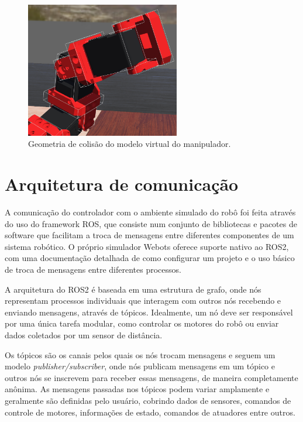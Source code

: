 \begin{figure}
    \centering
    \includegraphics[width=0.6\textwidth]{./Images/dynamic-model.png}
    \caption{Geometria de colisão do modelo virtual do manipulador.}\label{fig:dyn-chain}
\end{figure}

\section{Arquitetura de comunicação}

A comunicação do controlador com o ambiente simulado do robô foi feita através
do uso do framework ROS, que consiste num conjunto de bibliotecas e pacotes de
software que facilitam a troca de mensagens entre diferentes componentes de um
sistema robótico. O próprio simulador Webots oferece suporte nativo ao ROS2,
com uma documentação detalhada de como configurar um projeto e o uso básico de
troca de mensagens entre diferentes processos.

A arquitetura do ROS2 é baseada em uma estrutura de grafo, onde nós representam
processos individuais que interagem com outros nós recebendo e enviando
mensagens, através de tópicos. Idealmente, um nó deve ser responsável por uma
única tarefa modular, como controlar os motores do robô ou enviar dados
coletados por um sensor de distância.

Os tópicos são os canais pelos quais os nós trocam mensagens e seguem um modelo
\emph{publisher/subscriber}, onde nós publicam mensagens em um tópico e outros
nós se inscrevem para receber essas mensagens, de maneira completamente
anônima. As mensagens passadas nos tópicos podem variar amplamente e geralmente
são definidas pelo usuário, cobrindo dados de sensores, comandos de controle de
motores, informações de estado, comandos de atuadores entre outros.

